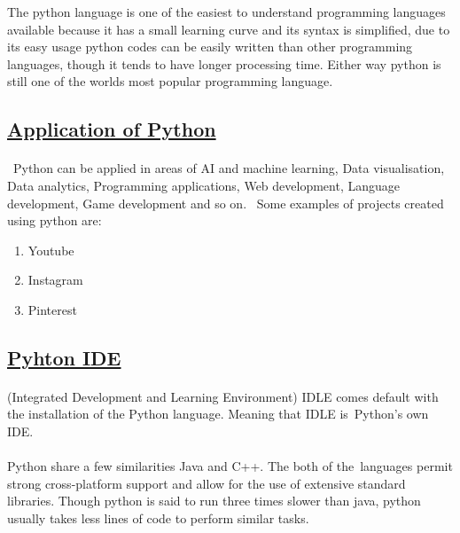 \documentclass[[12pt]{article}
\begin{document}
		The python language is one of the easiest to understand programming languages available because it has a small learning curve and its syntax is simplified, due to its easy usage python codes can be easily written than other programming languages, though it tends to have longer processing time. Either way python is still one of the worlds most popular programming language.
		
	\subsection*{\underline{Application of Python}}
		\paragraph{}
		 Python can be applied in areas of AI and machine learning, Data visualisation, Data analytics, Programming applications, Web development, Language development, Game development and so on.
		 Some  examples of projects created using python are:
		 

		\begin{enumerate}
			\item 	Youtube
			\item 	Instagram
			\item 	Pinterest
	\end{enumerate}
	
	
	
	\subsection*{\underline{Pyhton IDE}}
	\paragraph{}
	(Integrated Development and Learning Environment) IDLE comes default with the installation of the Python language.
	Meaning that IDLE is Python's own IDE.
	\paragraph{}
	Python share a few similarities Java and C++. The both of the languages permit strong cross-platform support and allow for the use of extensive standard libraries. Though python is said to run three times slower than java, python usually takes less lines of code to perform similar tasks.
	
	\newpage
\end{document}
